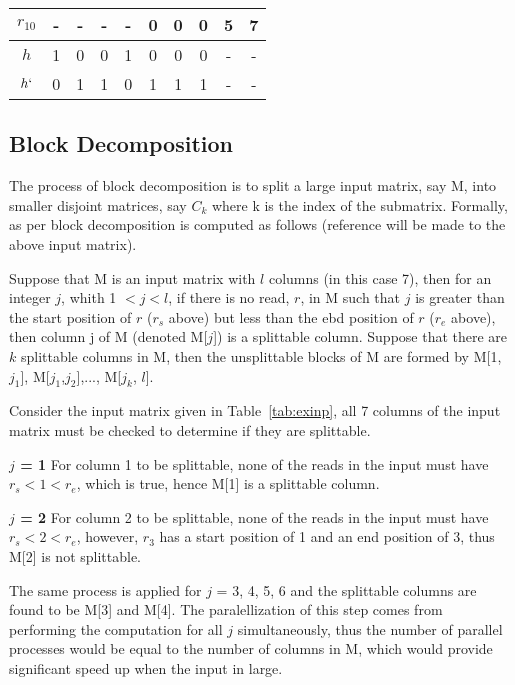 \documentclass[10pt,a4paer,twocolumn]{article}
\begin{document}
\begin{table}[h!]
\begin{tabular}{c c c c c c c c c c}
    $r_10$      & -     & -     & -     & -     & 0     & 0     & 0     & 5         & 7             \\
    \hline                                                                                          
    \hline                                                                                          
    $h$         & 1     & 0     & 0     & 1     & 0     & 0     & 0     & -         & -               \\
    $h`$        & 0     & 1     & 1     & 0     & 1     & 1     & 1     & -         & -               \\
    \hline
\end{tabular}
\end{table}

\subsection{Block Decomposition}

The process of block decomposition is to split a large input matrix, say M, into smaller disjoint matrices,
say $C_k$ where k is the index of the submatrix. Formally, as per \cite{chen:2013} block decomposition is
computed as follows (reference will be made to the above input matrix).

Suppose that M is an input matrix with $l$ columns (in this case 7), then for an integer $j$, whith 1 $< j <
l$, if there is no read, $r$, in M such that $j$ is greater than the start position of $r$ ($r_s$ above) but
less than the ebd position of $r$ ($r_e$ above), then column j of M (denoted M[$j$]) is a splittable column.
Suppose that there are $k$ splittable columns in M, then the unsplittable blocks of M are formed by M[1,
$j_1$], M[$j_1$,$j_2$],..., M[$j_k$, $l$]. 

Consider the input matrix given in Table~\ref{tab:exinp}, all 7 columns of the input matrix must be checked to
determine if they are splittable. 

\textbf{$j$ = 1} For column 1 to be splittable, none of the reads in the input must have $r_s < 1 < r_e$,
which is true, hence M[1] is a splittable column.

\textbf{$j$ = 2} For column 2 to be splittable, none of the reads in the input must have $r_s < 2 < r_e$,
however, $r_3$ has a start position of 1 and an end position of 3, thus M[2] is not splittable.

The same process is applied for $j$ = 3, 4, 5, 6 and the splittable columns are found to be M[3] and M[4]. The
paralellization of this step comes from performing the computation for all $j$ simultaneously, thus the number
of parallel processes would be equal to the number of columns in M, which would provide significant speed up
when the input in large.
\end{document}
